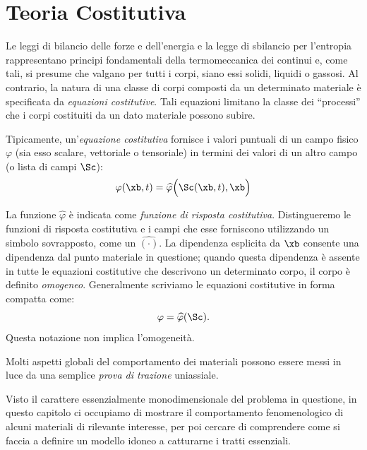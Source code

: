 \chapter{Teoria Costitutiva}


Le leggi di bilancio delle forze e dell'energia e la legge di sbilancio per l'entropia rappresentano principi fondamentali della termomeccanica dei continui e, come tali, si presume che valgano per tutti i corpi, siano essi solidi, liquidi o gassosi. Al contrario, la natura di una classe di corpi composti da un determinato materiale è specificata da \textit{equazioni costitutive}. Tali equazioni limitano la classe dei ``processi'' che i corpi costituiti da un dato materiale possono subire.



Tipicamente, un'\textit{equazione costitutiva} fornisce i valori puntuali di un campo fisico $\varphi$ (sia esso scalare, vettoriale o tensoriale) in termini dei valori di un altro campo (o lista di campi $\Sc$):
\begin{equation}
\varphi(\xb, t)=\widehat{\varphi}\Big(\Sc(\xb, t),\xb  \Big)
\end{equation}

 La funzione $\widehat{\varphi}$ è indicata come \textit{funzione di risposta costitutiva}. Distingueremo le funzioni di risposta costitutiva e i campi che esse forniscono utilizzando un simbolo sovrapposto, come un $\widehat{(\cdot)}$. La dipendenza esplicita da $\xb$ consente una dipendenza dal punto materiale in questione; quando questa dipendenza è assente in tutte le equazioni costitutive che descrivono un determinato corpo, il corpo è definito \textit{omogeneo}. Generalmente scriviamo le equazioni costitutive in forma compatta come:
\begin{equation}
\varphi=\widehat{\varphi}(\Sc).
\end{equation}
Questa notazione non implica l'omogeneità. 


Molti aspetti globali del comportamento dei materiali possono essere messi in luce da una semplice \textit{prova di trazione} uniassiale. 

Visto il carattere essenzialmente monodimensionale del problema in questione, in questo capitolo ci occupiamo di mostrare il comportamento fenomenologico di alcuni materiali di rilevante interesse, per poi cercare di comprendere come si faccia a definire un modello idoneo a catturarne i tratti essenziali.

